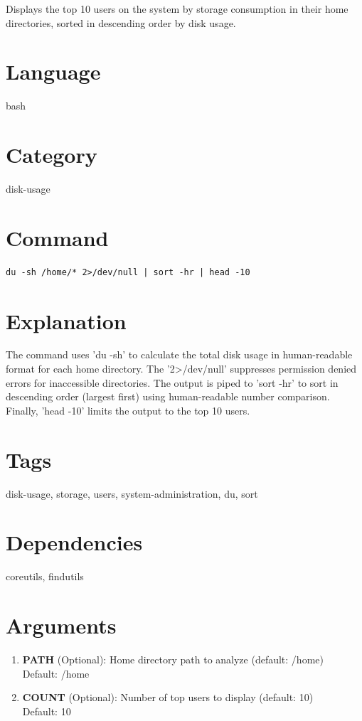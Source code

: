 \documentclass[openany]{book}
\begin{document}
\noindent Displays the top 10 users on the system by storage consumption in their home directories, sorted in descending order by disk usage.

\section*{Language}
bash

\section*{Category}
disk-usage

\section*{Command}
\begin{lstlisting}
du -sh /home/* 2>/dev/null | sort -hr | head -10
\end{lstlisting}

\section*{Explanation}
The command uses 'du -sh' to calculate the total disk usage in human-readable format for each home directory. The '2>/dev/null' suppresses permission denied errors for inaccessible directories. The output is piped to 'sort -hr' to sort in descending order (largest first) using human-readable number comparison. Finally, 'head -10' limits the output to the top 10 users.

\section*{Tags}
disk-usage, storage, users, system-administration, du, sort

\section*{Dependencies}
coreutils, findutils


\section*{Arguments}
\begin{enumerate}
  \item \textbf{PATH} (Optional): Home directory path to analyze (default: /home) \\ Default: /home
  \item \textbf{COUNT} (Optional): Number of top users to display (default: 10) \\ Default: 10
\end{enumerate}
\end{document}
